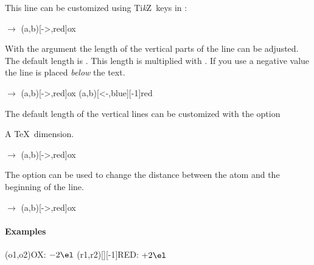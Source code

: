 \documentclass[load-preamble+]{cnltx-doc}
\newcommand*\TikZ{Ti\textit{k}Z}
\begin{document}
This line can be customized using \TikZ\ keys in :
\begin{example}
  \vspace{7mm}
   $\rightarrow$ \pch\redox(a,b)[->,red]{ox}
\end{example}

With the argument  the length of the vertical parts of the line can
be adjusted.  The default length is \code{.6em}.  This length is multiplied
with .  If you use a negative value the line is placed \emph{below}
the text.
\begin{example}
  \vspace{7mm}
   $\rightarrow$ \pch
  \redox(a,b)[->,red]{ox}
  \redox(a,b)[<-,blue][-1]{red}
  \vspace{7mm}
\end{example}

The default length of the vertical lines can be customized with the option
\begin{options}
  \Default{.6em}
    A \TeX\ dimension.
\end{options}

\begin{example}
  \vspace{7mm}
   $\rightarrow$ \pch\redox(a,b)[->,red]{ox}
\end{example}

\begin{options}
  \Default{.2em}
    The option can be used to change the distance between the atom and the
    beginning of the line.
\end{options}

\begin{example}
  \vspace{7mm}
   $\rightarrow$ \pch\redox(a,b)[->,red]{ox}
\end{example}

\paragraph{Examples}
\begin{example}
  \vspace{7mm}
  \redox(o1,o2){\small OX: $- 2\el$}
  \redox(r1,r2)[][-1]{\small RED: $+ 2\el$}
  \vspace{7mm}
\end{example}
\end{document}

